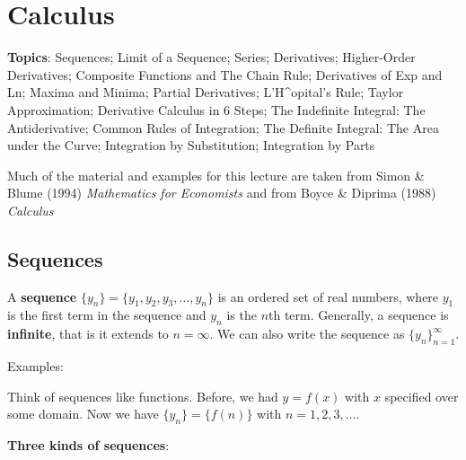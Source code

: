 \documentclass[]{book}
\theoremstyle{definition}
\theoremstyle{definition}
\theoremstyle{definition}
\theoremstyle{remark}
\begin{document}
\chapter{Calculus}\label{derivatives}

\textbf{Topics}: Sequences; Limit of a Sequence; Series; Derivatives;
Higher-Order Derivatives; Composite Functions and The Chain Rule;
Derivatives of Exp and Ln; Maxima and Minima; Partial Derivatives;
L'H\^{}opital's Rule; Taylor Approximation; Derivative Calculus in 6
Steps; The Indefinite Integral: The Antiderivative; Common Rules of
Integration; The Definite Integral: The Area under the Curve;
Integration by Substitution; Integration by Parts

Much of the material and examples for this lecture are taken from Simon
\& Blume (1994) \emph{Mathematics for Economists} and from Boyce \&
Diprima (1988) \emph{Calculus}

\section{Sequences}\label{sequences}

A \textbf{sequence} \(\{y_n\}=\{y_1, y_2, y_3, \ldots, y_n\}\) is an
ordered set of real numbers, where \(y_1\) is the first term in the
sequence and \(y_n\) is the \(n\)th term. Generally, a sequence is
\textbf{infinite}, that is it extends to \(n=\infty\). We can also write
the sequence as \(\{y_n\}^\infty_{n=1}\).

Examples:

Think of sequences like functions. Before, we had \(y=f(x)\) with \(x\)
specified over some domain. Now we have \(\{y_n\}=\{f(n)\}\) with
\(n=1,2,3,\ldots\).

\textbf{Three kinds of sequences}:
\end{document}
